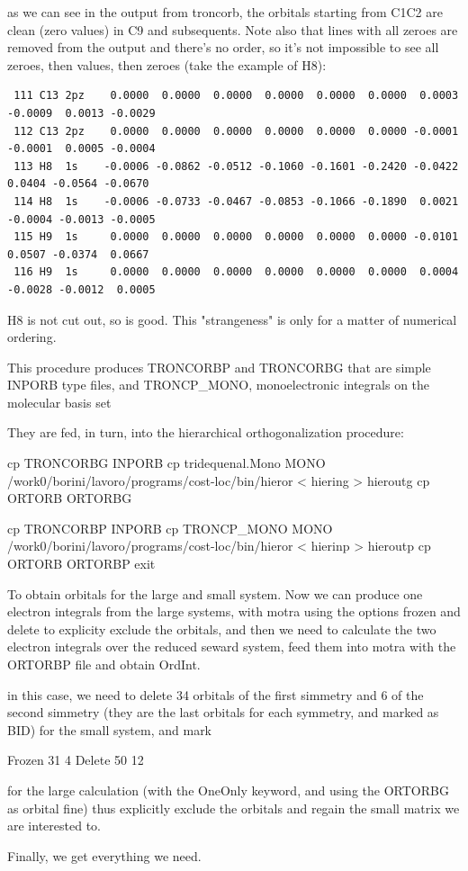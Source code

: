 \documentclass[a4paper,11pt]{report}
\begin{document}
as we can see in the output from troncorb, the orbitals starting from C1C2 are clean
(zero values) in C9 and subsequents. Note also that lines with all zeroes
are removed from the output and there's no order, so it's not impossible to
see all zeroes, then values, then zeroes (take the example of H8):

\begin{verbatim}
 111 C13 2pz    0.0000  0.0000  0.0000  0.0000  0.0000  0.0000  0.0003
-0.0009  0.0013 -0.0029
 112 C13 2pz    0.0000  0.0000  0.0000  0.0000  0.0000  0.0000 -0.0001
-0.0001  0.0005 -0.0004
 113 H8  1s    -0.0006 -0.0862 -0.0512 -0.1060 -0.1601 -0.2420 -0.0422
0.0404 -0.0564 -0.0670
 114 H8  1s    -0.0006 -0.0733 -0.0467 -0.0853 -0.1066 -0.1890  0.0021
-0.0004 -0.0013 -0.0005
 115 H9  1s     0.0000  0.0000  0.0000  0.0000  0.0000  0.0000 -0.0101
0.0507 -0.0374  0.0667
 116 H9  1s     0.0000  0.0000  0.0000  0.0000  0.0000  0.0000  0.0004
-0.0028 -0.0012  0.0005
\end{verbatim}

H8 is not cut out, so is good. This "strangeness" is only for a matter
of numerical ordering.

This procedure produces TRONCORBP and TRONCORBG that are simple INPORB type
files, and TRONCP\_MONO, monoelectronic integrals on the molecular basis set 

They are fed, in turn, into the hierarchical orthogonalization procedure:

cp TRONCORBG INPORB
cp tridequenal.Mono MONO
/work0/borini/lavoro/programs/cost-loc/bin/hieror < hiering > hieroutg
cp ORTORB ORTORBG

cp TRONCORBP INPORB
cp TRONCP\_MONO MONO
/work0/borini/lavoro/programs/cost-loc/bin/hieror < hierinp > hieroutp
cp ORTORB ORTORBP
exit

To obtain orbitals for the large and small system. Now we can produce
one electron integrals from the large systems, with motra using the options
frozen and delete to explicity exclude the orbitals, and then we need to
calculate the two electron integrals over the reduced seward system, feed
them into motra with the ORTORBP file and obtain OrdInt.

in this case, we need to delete 34 orbitals of the first simmetry and 6 of
the second simmetry (they are the last orbitals for each symmetry, and
marked as BID) for the small system, and mark

Frozen
 31 4
Delete
 50 12

for the large calculation (with the OneOnly keyword, and using the ORTORBG as orbital
fine) thus explicitly exclude the orbitals and regain the small matrix we
are interested to.

Finally, we get everything we need.
\end{document}
